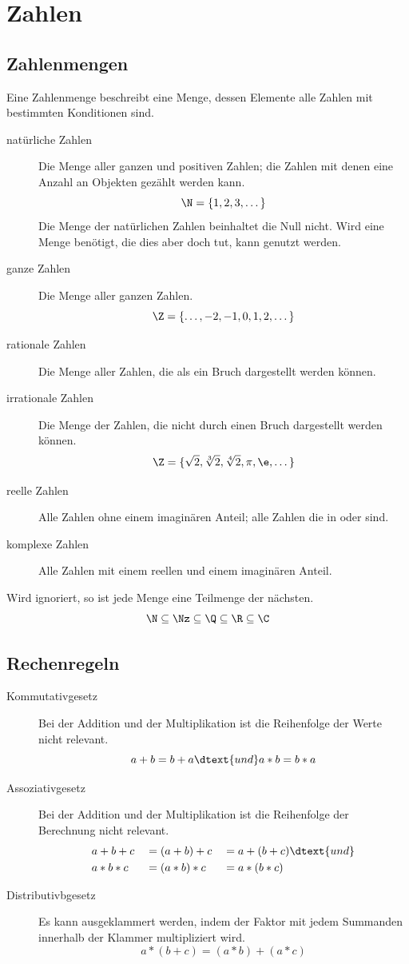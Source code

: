 \documentclass{article}
\begin{document}
\section{Zahlen}
\subsection{Zahlenmengen}
Eine Zahlenmenge beschreibt eine Menge, dessen Elemente alle Zahlen mit bestimmten Konditionen sind.
\begin{description}
 \item[natürliche Zahlen \tN] Die Menge aller ganzen und positiven Zahlen; die Zahlen mit denen \zb eine Anzahl an Objekten gezählt werden kann.
\[
 \N = \{1, 2, 3, \dots\}
\]
Die Menge der natürlichen Zahlen beinhaltet die Null nicht. Wird eine Menge benötigt, die dies aber doch tut, kann \tNz genutzt werden.
 \item[ganze Zahlen \tZ] Die Menge aller ganzen Zahlen.
\[
 \Z = \{\dots, -2, -1, 0, 1, 2, \dots\}
\]
 \item[rationale Zahlen \tQ] Die Menge aller Zahlen, die als ein Bruch dargestellt werden können.
 \item[irrationale Zahlen \tI] Die Menge der Zahlen, die nicht durch einen Bruch dargestellt werden können.
\[
 \Z = \{\sqrt{2}, \sqrt[3]{2}, \sqrt[4]{2}, \pi, \e, \dots\}
\]
 \item[reelle Zahlen \tR] Alle Zahlen ohne einem imaginären Anteil; alle Zahlen die in \tQ oder \tI sind.
 \item[komplexe Zahlen \tC] Alle Zahlen mit einem reellen und einem imaginären Anteil.
\end{description} 
Wird \tI ignoriert, so ist jede Menge eine Teilmenge der nächsten.
\[
 \N \subseteq \Nz \subseteq \Q \subseteq \R \subseteq \C
\]

\subsection{Rechenregeln}
\begin{description}
 \item[Kommutativgesetz] Bei der Addition und der Multiplikation ist die Reihenfolge der Werte nicht relevant.
\[
 a+b=b+a \dtext{und} a*b=b*a
\]
 \item[Assoziativgesetz] Bei der Addition und der Multiplikation ist die Reihenfolge der Berechnung nicht relevant.
\begin{alignat*}{3}
 &a+b+c &&= (a+b)+c &&= a+(b+c) \dtext{und} \\
 &a*b*c &&= (a*b)*c &&= a*(b*c)
\end{alignat*}
 \item[Distributivbgesetz] Es kann ausgeklammert werden, indem der Faktor mit jedem Summanden innerhalb der Klammer multipliziert wird.
\[
 a*(b+c) = (a*b)+(a*c)
\]
\end{description}
\end{document}
